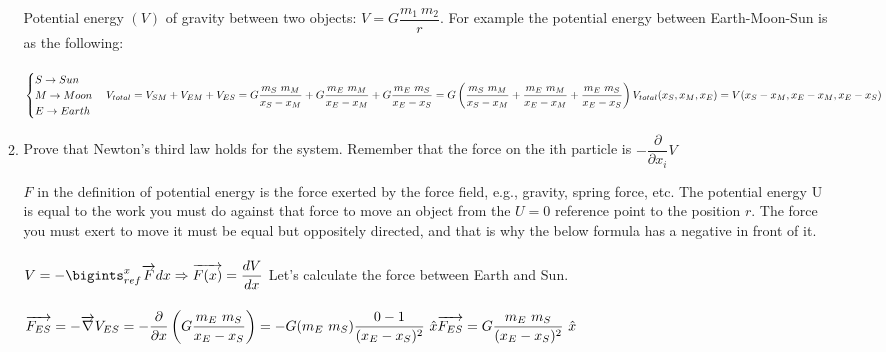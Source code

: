 \documentclass[fleqn]{article}
\begin{document}
\begin{enumerate}
\begin{enumerate}
      \textcolor{hwColor}{
        Potential energy $(V)$ of gravity between two objects: $V=G\dfrac{m_1 ~ m_2}{r}$. For example 
        the potential energy between Earth-Moon-Sun is as the following: \\
        \\
        $
          \begin{cases}
            S \rightarrow Sun \\
            M \rightarrow Moon \\
            E \rightarrow Earth \\
          \end{cases} \\
          \\
          V_{total}=V_{SM}+V_{EM}+V_{ES} \\
          \\
          =G\dfrac{m_S ~ m_M}{x_S-x_M}+G\dfrac{m_E ~ m_M}{x_E-x_M}+G\dfrac{m_E ~ m_S}{x_E-x_S}=G\left(\dfrac{m_S ~ m_M}{x_S-x_M}+\dfrac{m_E ~ m_M}{x_E-x_M}+\dfrac{m_E ~ m_S}{x_E-x_S}\right) \\
          \\
          V_{total}(x_S, x_M, x_E)=V(x_S-x_M, x_E-x_M, x_E-x_S)
        $
      }

      \item Prove that Newton’s third law holds for the system. Remember
      that the force on the ith particle is $-\dfrac{\partial }{\partial x_i}V$

      \textcolor{hwColor}{
        $F$ in the definition of potential energy is the force exerted by the force field, e.g., gravity, spring force, etc. 
        The potential energy U is equal to the work you must do against that force to move an object from the $U=0$ reference point to the position $r$.
        The force you must exert to move it must be equal but oppositely directed, and that is why the below formula has a negative in front of it. \\
        \\
        $
          V=-\bigints_{ref}^{x} \overrightarrow{F} dx \Rightarrow \overrightarrow{F(x)}=\dfrac{dV}{dx} \\ \\
        $
        Let's calculate the force between Earth and Sun. \\
        \\
        $
          \overrightarrow{F_{ES}}=-\overrightarrow{\nabla}V_{ES}=-\dfrac{\partial}{\partial x}\left(G\dfrac{m_E ~ m_S}{x_E-x_S}\right)=-G(m_E ~ m_S)\dfrac{0-1}{(x_E-x_S)^2} ~ \hat{x} \\
          \\
          \overrightarrow{F_{ES}}=G\dfrac{m_E ~ m_S}{(x_E-x_S)^2} ~ \hat{x} \\
        $
      }


\end{enumerate}
\end{enumerate}
\end{document}
